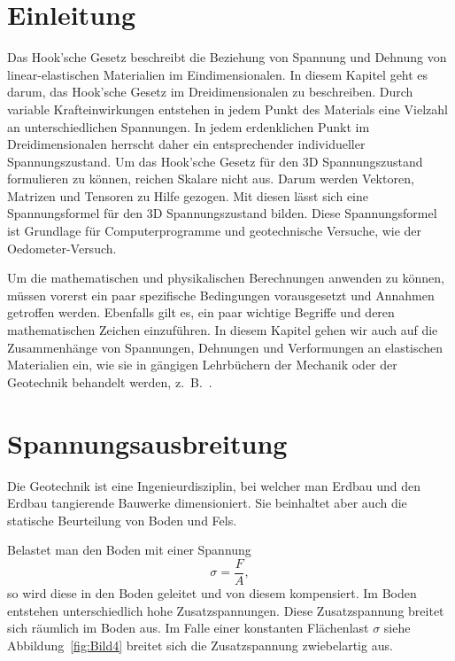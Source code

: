 \section{Einleitung\label{spannung:section:Einleitung}}
Das Hook'sche Gesetz beschreibt die Beziehung von Spannung und Dehnung von linear-elastischen Materialien im Eindimensionalen.
%
%
%
%
In diesem Kapitel geht es darum, das Hook'sche Gesetz im Dreidimensionalen zu beschreiben.
Durch variable Krafteinwirkungen entstehen in jedem Punkt des Materials eine Vielzahl an unterschiedlichen Spannungen.
In jedem erdenklichen Punkt im Dreidimensionalen herrscht daher ein entsprechender individueller Spannungszustand.
Um das Hook'sche Gesetz für den 3D Spannungszustand formulieren zu können, reichen Skalare nicht aus.
Darum werden Vektoren, Matrizen und Tensoren zu Hilfe gezogen.
Mit diesen lässt sich eine Spannungsformel für den 3D Spannungszustand bilden.
Diese Spannungsformel ist Grundlage für Computerprogramme und geotechnische Versuche, wie der Oedometer-Versuch.
%

Um die mathematischen und physikalischen Berechnungen anwenden zu können,
müssen vorerst ein paar spezifische Bedingungen vorausgesetzt und Annahmen getroffen werden.
Ebenfalls gilt es, ein paar wichtige Begriffe und deren mathematischen Zeichen einzuführen.
In diesem Kapitel gehen wir auch auf die Zusammenhänge von Spannungen, Dehnungen und Verformungen an elastischen Materialien ein,
wie sie in gängigen Lehrbüchern der Mechanik oder der Geotechnik behandelt werden, z.~B.~\cite{spannung:Grundlagen-der-Geotechnik}.

\section{Spannungsausbreitung\label{spannung:section:Spannungsausbreitung}}
Die Geotechnik ist eine Ingenieurdisziplin, bei welcher man Erdbau und den Erdbau tangierende Bauwerke dimensioniert.
%
%
Sie beinhaltet aber auch die statische Beurteilung von Boden und Fels.
%
%

Belastet man den Boden mit einer Spannung
\[
\sigma
=
\frac{F}{A}
,
\]
so wird diese in den Boden geleitet und von diesem kompensiert.
Im Boden entstehen unterschiedlich hohe Zusatzspannungen.
Diese Zusatzspannung breitet sich räumlich im Boden aus.
Im Falle einer konstanten Flächenlast $\sigma$ siehe Abbildung~\ref{fig:Bild4} breitet sich die Zusatzspannung zwiebelartig aus.

